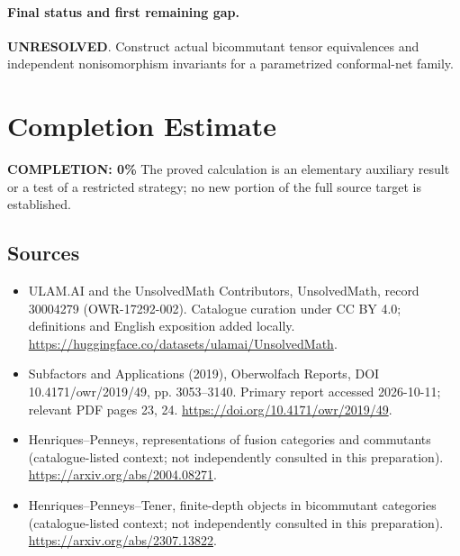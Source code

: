 \documentclass[11pt]{article}
\begin{document}
\paragraph{Final status and first remaining gap.}
\textbf{UNRESOLVED}. Construct actual bicommutant tensor equivalences and independent nonisomorphism invariants for a parametrized conformal-net family.

\section{Completion Estimate}
\noindent\textbf{COMPLETION: 0\%}
The proved calculation is an elementary auxiliary result or a test of a restricted strategy; no new portion of the full source target is established.

\subsection{Sources}
\begin{itemize}
\item[\hypertarget{source:30004279:1}{S1}] ULAM.AI and the UnsolvedMath Contributors, UnsolvedMath, record 30004279 (OWR-17292-002). Catalogue curation under CC BY 4.0; definitions and English exposition added locally.
\url{https://huggingface.co/datasets/ulamai/UnsolvedMath}.
\item[\hypertarget{source:30004279:2}{S2}] Subfactors and Applications (2019), Oberwolfach Reports, DOI 10.4171/owr/2019/49, pp. 3053--3140. Primary report accessed 2026-10-11; relevant PDF pages 23, 24.
\url{https://doi.org/10.4171/owr/2019/49}.
\item[\hypertarget{source:30004279:3}{S3}] Henriques--Penneys, representations of fusion categories and commutants (catalogue-listed context; not independently consulted in this preparation).
\url{https://arxiv.org/abs/2004.08271}.
\item[\hypertarget{source:30004279:4}{S4}] Henriques--Penneys--Tener, finite-depth objects in bicommutant categories (catalogue-listed context; not independently consulted in this preparation).
\url{https://arxiv.org/abs/2307.13822}.
\end{itemize}
\label{end:30004279}
\end{document}
